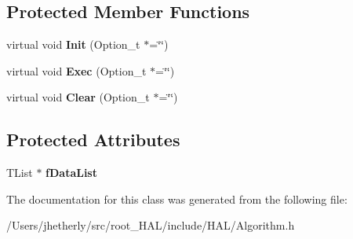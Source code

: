 \subsection*{Protected Member Functions}
\begin{DoxyCompactItemize}
\item 
\hypertarget{class_h_a_l_1_1_algorithm_abe2da2ce6a2d3ccfb492d8afd1d07331}{virtual void {\bfseries Init} (Option\-\_\-t $\ast$=\char`\"{}\char`\"{})}\label{class_h_a_l_1_1_algorithm_abe2da2ce6a2d3ccfb492d8afd1d07331}

\item 
\hypertarget{class_h_a_l_1_1_algorithm_a438c5c54698aa014b660474d08703bc2}{virtual void {\bfseries Exec} (Option\-\_\-t $\ast$=\char`\"{}\char`\"{})}\label{class_h_a_l_1_1_algorithm_a438c5c54698aa014b660474d08703bc2}

\item 
\hypertarget{class_h_a_l_1_1_algorithm_a2a26a5549e92efaa968763ac51e6758a}{virtual void {\bfseries Clear} (Option\-\_\-t $\ast$=\char`\"{}\char`\"{})}\label{class_h_a_l_1_1_algorithm_a2a26a5549e92efaa968763ac51e6758a}

\end{DoxyCompactItemize}
\subsection*{Protected Attributes}
\begin{DoxyCompactItemize}
\item 
\hypertarget{class_h_a_l_1_1_algorithm_aacc4824bcc223fc86f0f57662393e56c}{T\-List $\ast$ {\bfseries f\-Data\-List}}\label{class_h_a_l_1_1_algorithm_aacc4824bcc223fc86f0f57662393e56c}

\end{DoxyCompactItemize}


The documentation for this class was generated from the following file\-:\begin{DoxyCompactItemize}
\item 
/\-Users/jhetherly/src/root\-\_\-\-H\-A\-L/include/\-H\-A\-L/Algorithm.\-h\end{DoxyCompactItemize}
